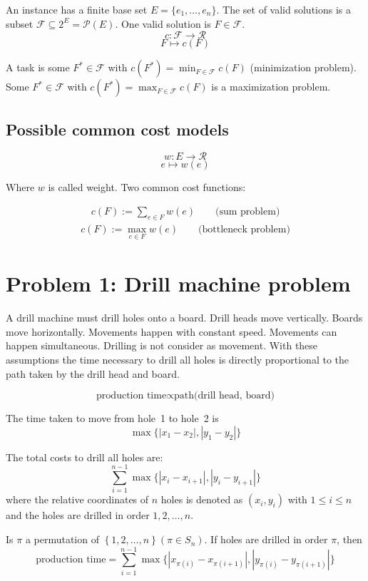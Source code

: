 \documentclass{article}
\newcommand{\set}[1]{\left\{#1\right\}}
\begin{document}
An instance has a finite base set $E = \{e_1, \ldots, e_n\}$.
The set of valid solutions is a subset $\mathcal{F} \subseteq 2^E = \mathcal{P}(E)$.
One valid solution is $F \in \mathcal{F}$.
\[
    c : \mathcal{F} \rightarrow \mathcal{R}
\] \[
    F \mapsto c(F)
\]

A task is some $F^* \in \mathcal{F}$ with $c(F^*) = \min_{F \in \mathcal{F}} c(F)$
(minimization problem). Some $F^* \in \mathcal{F}$ with $c(F^*) = \max_{F \in \mathcal{F}} c(F)$
is a maximization problem.

\subsection{Possible common cost models}
%
\[
    w: E \rightarrow \mathcal{R}
\] \[
    e \mapsto w(e)
\]

Where $w$ is called weight. Two common cost functions:

\begin{align}
    c(F) := \sum_{e \in F} w(e)  \qquad \text{(sum problem)}
\end{align}
\begin{align}
    c(F) := \max_{e \in F} w(e)  \qquad \text{(bottleneck problem)}
\end{align}

\section{Problem 1: Drill machine problem}
%
A drill machine must drill holes onto a board. Drill heads move vertically. Boards move horizontally. Movements happen with constant speed. Movements can happen simultaneous. Drilling is not consider as movement. With these assumptions the time necessary to drill all holes is directly proportional to the path taken by the drill head and board.

\[
    \text{production time} \propto \text{path(drill head, board)}
\]

The time taken to move from hole~1 to hole~2 is
\[
    \max\{|x_1 - x_2|, |y_1 - y_2|\}
\]

The total costs to drill all holes are:
\[
    \sum_{i=1}^{n-1} \max\{|x_i - x_{i+1}|, |y_i - y_{i+1}|\}
\]
where the relative coordinates of $n$ holes is denoted as $(x_i, y_i)$ with $1 \leq i \leq n$ and the holes are drilled in order $1, 2, \ldots, n$.

Is $\pi$ a permutation of $\set{1, 2, \ldots, n} (\pi \in S_n)$. If holes are drilled in order $\pi$, then
\[
    \text{production time} = \sum_{i=1}^{n-1} \max\{|x_{\pi(i)} - x_{\pi(i+1)}|, |y_{\pi(i)} - y_{\pi(i+1)}|\}
\]
\end{document}
